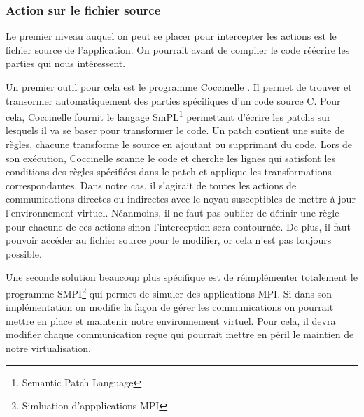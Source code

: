 \subsubsection{Action sur le fichier source}
\label{section:source}
Le premier niveau auquel on peut se placer pour intercepter les actions est le fichier source de l'application. On pourrait avant de compiler le code réécrire les parties qui nous intéressent.

Un premier outil pour cela est le programme Coccinelle \citep{cocci}. Il permet de trouver et transormer automatiquement des parties spécifiques d'un code source C. Pour cela, Coccinelle fournit le langage SmPL\footnote{Semantic Patch Language} permettant d'écrire les patchs sur lesquels il va se baser pour transformer le code. Un patch contient une suite de règles, chacune transforme le source en ajoutant ou supprimant du code. Lors de son exécution, Coccinelle scanne le code et cherche les lignes qui satisfont les conditions des règles spécifiées dans le patch et applique les transformations correspondantes. Dans notre cas, il s'agirait de toutes les actions de communications directes ou indirectes avec le noyau susceptibles de mettre à jour l'environnement virtuel. Néanmoins, il ne faut pas oublier de définir une règle pour chacune de ces actions sinon l'interception sera contournée. De plus, il faut pouvoir accéder au fichier source pour le modifier, or cela n'est pas toujours possible.

Une seconde solution beaucoup plus spécifique est de réimplémenter totalement le programme SMPI\footnote{Simluation d'appplications MPI} \citep{SMPI, clauss2011single} qui permet de simuler des applications MPI. Si dans son implémentation on modifie la façon de gérer les communications on pourrait mettre en place et maintenir notre environnement virtuel. Pour cela, il devra modifier chaque communication reçue qui pourrait mettre en péril le maintien de notre virtualisation.

